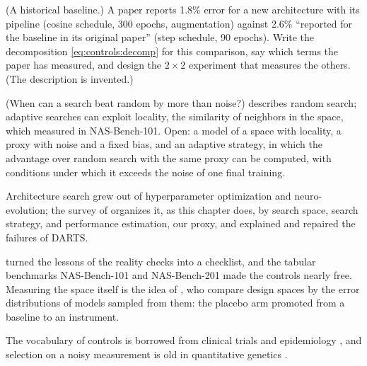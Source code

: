 \begin{refsection}
\begin{exercises}
\item \critique (A historical baseline.) A paper reports 1.8\% error for a new architecture with its pipeline (cosine schedule, 300 epochs, augmentation) against 2.6\% ``reported for the baseline in its original paper'' (step schedule, 90 epochs). Write the decomposition \eqref{eq:controls:decomp} for this comparison, say which terms the paper has measured, and design the $2\times2$ experiment that measures the others. (The description is invented.)\label{ex:controls:critique2}

\item \research (When can a search beat random by more than noise?)  describes random search; adaptive searches can exploit locality, the similarity of neighbors in the space, which \textcite{YingEtAl2019} measured in NAS-Bench-101. Open: a model of a space with locality, a proxy with noise and a fixed bias, and an adaptive strategy, in which the advantage over random search with the same proxy can be computed, with conditions under which it exceeds the noise of one final training.\label{ex:controls:research}
\end{exercises}

\notesandrefs
Architecture search grew out of hyperparameter optimization and neuro-evolution; the survey of \textcite{ElskenMetzenHutter2019} organizes it, as this chapter does, by search space, search strategy, and performance estimation, our proxy, and \textcite{ZelaEtAl2020} explained and repaired the failures of DARTS.

\Textcite{LindauerHutter2020} turned the lessons of the reality checks into a checklist, and the tabular benchmarks NAS-Bench-101 \parencite{YingEtAl2019} and NAS-Bench-201 \parencite{DongYang2020} made the controls nearly free. Measuring the space itself is the idea of \textcite{RadosavovicEtAl2019}, who compare design spaces by the error distributions of models sampled from them: the placebo arm promoted from a baseline to an instrument.

The vocabulary of controls is borrowed from clinical trials \parencite{ICH2000,SacksChalmersSmith1982} and epidemiology \parencite{LipsitchEtAl2010}, and selection on a noisy measurement is old in quantitative genetics \parencite{FalconerMackay1996,WalshLynch2018}.


\end{refsection}
